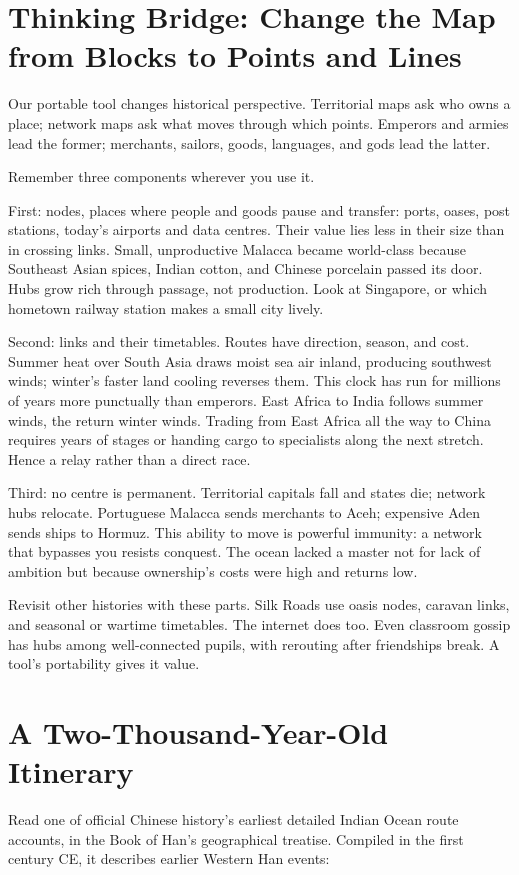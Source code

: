 \section[Thinking Bridge: Points and Lines]{Thinking Bridge: Change the Map from Blocks to Points and Lines}
Our portable tool changes historical perspective. Territorial maps ask who owns a place; network maps ask what moves through which points. Emperors and armies lead the former; merchants, sailors, goods, languages, and gods lead the latter.

Remember three components wherever you use it.

First: nodes, places where people and goods pause and transfer: ports, oases, post stations, today's airports and data centres. Their value lies less in their size than in crossing links. Small, unproductive Malacca became world-class because Southeast Asian spices, Indian cotton, and Chinese porcelain passed its door. Hubs grow rich through passage, not production. Look at Singapore, or which hometown railway station makes a small city lively.

Second: links and their timetables. Routes have direction, season, and cost. Summer heat over South Asia draws moist sea air inland, producing southwest winds; winter's faster land cooling reverses them. This clock has run for millions of years more punctually than emperors. East Africa to India follows summer winds, the return winter winds. Trading from East Africa all the way to China requires years of stages or handing cargo to specialists along the next stretch. Hence a relay rather than a direct race.

Third: no centre is permanent. Territorial capitals fall and states die; network hubs relocate. Portuguese Malacca sends merchants to Aceh; expensive Aden sends ships to Hormuz. This ability to move is powerful immunity: a network that bypasses you resists conquest. The ocean lacked a master not for lack of ambition but because ownership's costs were high and returns low.

Revisit other histories with these parts. Silk Roads use oasis nodes, caravan links, and seasonal or wartime timetables. The internet does too. Even classroom gossip has hubs among well-connected pupils, with rerouting after friendships break. A tool's portability gives it value.

\section{A Two-Thousand-Year-Old Itinerary}
Read one of official Chinese history's earliest detailed Indian Ocean route accounts, in the Book of Han's geographical treatise. Compiled in the first century CE, it describes earlier Western Han events:

